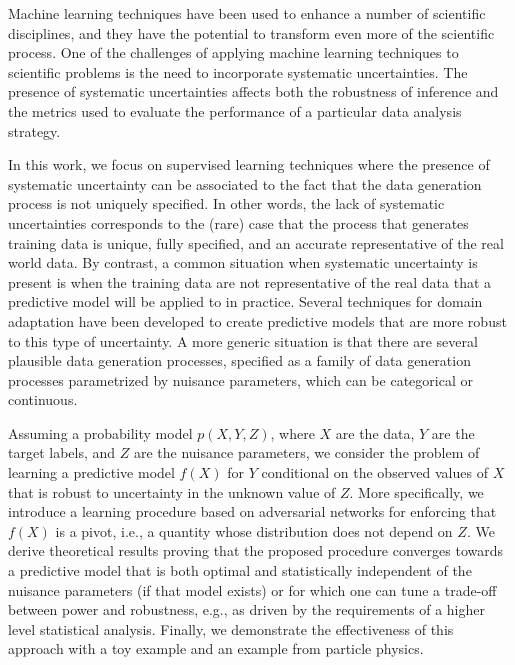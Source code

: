 \documentclass{article}
\theoremstyle{plain}
\begin{document}
Machine learning techniques have been used to enhance a number of scientific
disciplines, and they have the potential to transform even more of the
scientific process. One of the challenges of applying machine learning
techniques to scientific problems is the need to incorporate systematic
uncertainties. The presence of systematic uncertainties affects both the
robustness of inference and the metrics used to evaluate the performance of a
particular data analysis strategy.

In this work, we focus on supervised learning techniques where the presence of
systematic uncertainty can be associated to the fact that the data generation
process is not uniquely specified. In other words, the lack of systematic
uncertainties corresponds to the (rare) case that the process that generates
training data is unique, fully specified, and an accurate representative of the
real world data. By contrast, a common situation when systematic uncertainty is
present is when the training data are not representative of the real data that a
predictive model will be applied to in practice. Several techniques for domain
adaptation have been developed to create predictive models that are more robust
to this type of uncertainty. A more generic situation is that there are several
plausible data generation processes, specified as a family of data generation
processes parametrized by nuisance parameters, which can be categorical or
continuous.

Assuming a probability model $p(X,Y,Z)$, where $X$ are the data, $Y$ are the
target labels, and $Z$ are the nuisance parameters, we consider the problem of
learning a predictive model $f(X)$ for $Y$ conditional on the observed values of $X$
that is robust to uncertainty in the unknown value of $Z$. More specifically, we
introduce a learning procedure based on adversarial networks
for enforcing that  $f(X)$ is a pivot, i.e., a quantity whose distribution
does not depend on $Z$.
We derive theoretical results proving that the proposed procedure
converges towards a predictive model that is both optimal and statistically independent of the
nuisance parameters (if that model exists) or for which one can tune a
trade-off between power and robustness, e.g., as driven by the requirements of a higher level statistical analysis.
Finally, we demonstrate the
effectiveness of this approach with a toy example and an example from particle physics.
\end{document}
